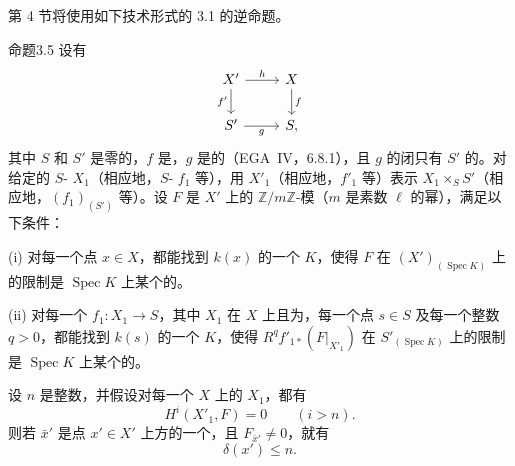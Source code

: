 第 4 节将使用如下技术形式的 3.1 的逆命题。
\begin{SGAresult}{命题}{3.5}
设有
\[
\begin{tikzcd}
X'\arrow[r,"h"]\arrow[d,"f'"']&X\arrow[d,"f"]\\
S'\arrow[r,"g"']&S,
\end{tikzcd}
\]
其中 $S$ 和 $S'$ 是零的，$f$ 是，$g$ 是的（EGA~IV，6.8.1），且 $g$ 的闭只有 $S'$ 的。对给定的 $S$- $X_1$（相应地，$S$- $f_1$ 等），用 $X'_1$（相应地，$f'_1$ 等）表示 $X_1\times_S S'$（相应地，$(f_1)_{(S')}$ 等）。设 $F$ 是 $X'$ 上的 $\mathbb Z/m\mathbb Z$-模（$m$ 是素数 $\ell$ 的幂），满足以下条件：

(i) 对每一个点 $x\in X$，都能找到 $k(x)$ 的一个 $K$，使得 $F$ 在 $(X')_{(\operatorname{Spec}K)}$ 上的限制是 $\operatorname{Spec}K$ 上某个的。

(ii) 对每一个 $f_1:X_1\to S$，其中 $X_1$ 在 $X$ 上且为，每一个点 $s\in S$ 及每一个整数 $q>0$，都能找到 $k(s)$ 的一个 $K$，使得 $R^qf'_{1*}(F|_{X'_1})$ 在 $S'_{(\operatorname{Spec}K)}$ 上的限制是 $\operatorname{Spec}K$ 上某个的。

设 $n$ 是整数，并假设对每一个 $X$ 上的 $X_1$，都有
\[
H^i(X'_1,F)=0\qquad(i>n).
\]
则若 $\bar x'$ 是点 $x'\in X'$ 上方的一个，且 $F_{\bar x'}\ne0$，就有
\[
\delta(x')\leq n.
\]
\end{SGAresult}
